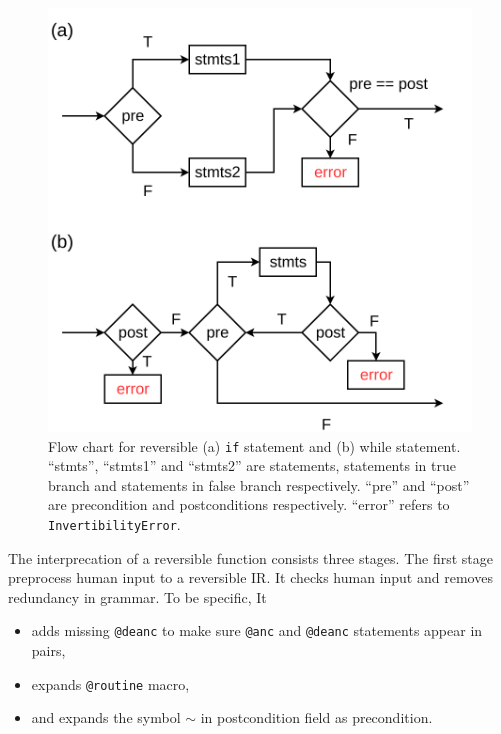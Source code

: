 \documentclass[aps,twocolumn,longbibliography,english,superscriptaddress,prr]{revtex4-1}
\newcommand{\<}{\langle}
\renewcommand{\>}{\rangle}
\theoremstyle{definition}\newtheorem{definition}{\textit{Definition}}
\begin{document}
\begin{figure}
    \centerline{\includegraphics[width=0.7\columnwidth,trim={0 0cm 0 0cm},clip]{images/controlflow.pdf}}
    \caption{Flow chart for reversible (a) \texttt{if} statement and (b) while statement. ``stmts'', ``stmts1'' and ``stmts2'' are statements, statements in true branch and statements in false branch respectively. ``pre'' and ``post'' are precondition and postconditions respectively. ``error'' refers to \texttt{InvertibilityError}.}\label{fig:controlflow}
\end{figure}

The interprecation of a reversible function consists three stages.
The first stage preprocess human input to a reversible IR. It checks human input and removes redundancy in grammar. To be specific, It
\begin{itemize}
    \item adds missing \texttt{@deanc} to make sure \texttt{@anc} and \texttt{@deanc} statements appear in pairs,
    \item expands \texttt{@routine} macro,
    \item and expands the symbol \texttt{$\sim$} in postcondition field as precondition.
\end{itemize}
\end{document}
